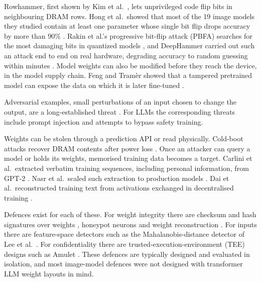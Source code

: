 \begin{description}[leftmargin=*,style=nextline]
  \item[Integrity of the weights.] Rowhammer, first shown by Kim et al.\ \cite{kim2014flipping},
        lets unprivileged code flip bits in neighbouring DRAM rows. Hong et al.\ showed that most
        of the 19 image models they studied contain at least one parameter whose single bit flip
        drops accuracy by more than 90\% \cite{hong2019terminal}. Rakin et al.'s progressive
        bit-flip attack (PBFA) searches for the most damaging bits in quantized models
        \cite{rakin2019bfa}, and DeepHammer carried out such an attack end to end on real
        hardware, degrading accuracy to random guessing within minutes \cite{yao2020deephammer}.
        Model weights can also be modified before they reach the device, in the model supply
        chain. Feng and Tram\`er showed that a tampered pretrained model can expose the data
        on which it is later fine-tuned \cite{feng2024privacy}.
  \item[Integrity of the computation's inputs.] Adversarial examples, small perturbations of
        an input chosen to change the output, are a long-established threat
        \cite{goodfellow2015explaining,madry2018towards}. For LLMs the corresponding threats
        include prompt injection and attempts to bypass safety training.
  \item[Confidentiality of the weights and the training data.] Weights can be stolen through
        a prediction API \cite{tramer2016stealing} or read physically. Cold-boot attacks recover
        DRAM contents after power loss \cite{halderman2008lest}. Once an attacker can query a
        model or holds its weights, memorised training data becomes a target. Carlini et al.\
        extracted verbatim training sequences, including personal information, from GPT-2
        \cite{carlini2021extracting}. Nasr et al.\ scaled such extraction to production models
        \cite{nasr2023scalable}. Dai et al.\ reconstructed training text from activations
        exchanged in decentralised training \cite{dai2025activation}.
\end{description}

Defences exist for each of these. For weight integrity there are checksum and hash
signatures over weights \cite{li2021radar,javaheripi2021hashtag,guo2021modelshield}, honeypot
neurons \cite{liu2023neuropots} and weight reconstruction \cite{li2020defending}. For inputs
there are feature-space detectors such as the Mahalanobis-distance detector of Lee et al.\
\cite{lee2018simple}. For confidentiality there are trusted-execution-environment (TEE) designs
such as Amulet \cite{mao2025amulet}. These defences are typically designed and evaluated in
isolation, and most image-model defences were not designed with transformer LLM weight layouts
in mind.

